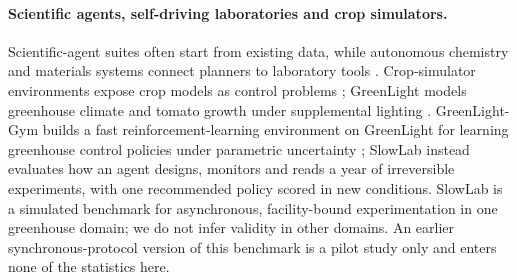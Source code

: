\paragraph{Scientific agents, self-driving laboratories and crop simulators.} Scientific-agent suites often start from existing data, while autonomous chemistry and materials systems connect planners to laboratory tools \citep{scienceagentbench,discoverybench,coscientist,chemcrow,szymanski2023autonomous,burger2020mobile}. Crop-simulator environments expose crop models as control problems \citep{wofostgym}; GreenLight models greenhouse climate and tomato growth under supplemental lighting \citep{katzin2020greenlight}. GreenLight-Gym builds a fast reinforcement-learning environment on GreenLight for learning greenhouse control policies under parametric uncertainty \citep{vanlaatum2025greenlightgym}; SlowLab instead evaluates how an agent designs, monitors and reads a year of irreversible experiments, with one recommended policy scored in new conditions. SlowLab is a simulated benchmark for asynchronous, facility-bound experimentation in one greenhouse domain; we do not infer validity in other domains. An earlier synchronous-protocol version of this benchmark \citep{slowlab_v21} is a pilot study only and enters none of the statistics here.
